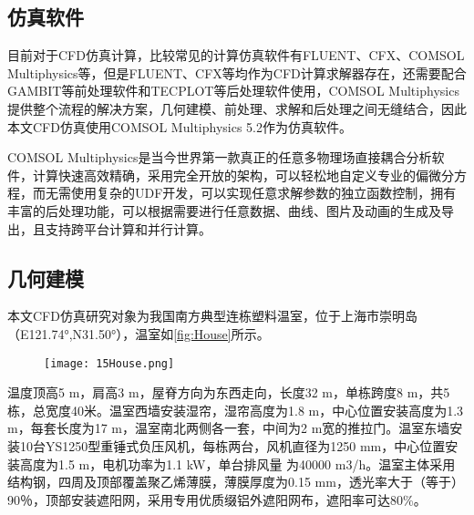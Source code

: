 	\subsection{仿真软件}
	目前对于CFD仿真计算，比较常见的计算仿真软件有FLUENT、CFX、COMSOL Multiphysics等，但是FLUENT、CFX等均作为CFD计算求解器存在，还需要配合GAMBIT等前处理软件和TECPLOT等后处理软件使用，COMSOL Multiphysics提供整个流程的解决方案，几何建模、前处理、求解和后处理之间无缝结合，因此本文CFD仿真使用COMSOL Multiphysics 5.2作为仿真软件。
	
COMSOL Multiphysics是当今世界第一款真正的任意多物理场直接耦合分析软件，计算快速高效精确，采用完全开放的架构，可以轻松地自定义专业的偏微分方程，而无需使用复杂的UDF开发，可以实现任意求解参数的独立函数控制，拥有丰富的后处理功能，可以根据需要进行任意数据、曲线、图片及动画的生成及导出，且支持跨平台计算和并行计算\supercite{Comsol2015}。

	\subsection{几何建模}
本文CFD仿真研究对象为我国南方典型连栋塑料温室，位于上海市崇明岛（E121.74°,N31.50°），温室如\ref{fig:House}所示。
	\begin{figure}[!htp]
		\centering
		\texttt{[image: 15House.png]}
	\end{figure}
温度顶高5 m，肩高3 m，屋脊方向为东西走向，长度32 m，单栋跨度8 m，共5栋，总宽度40米。温室西墙安装湿帘，湿帘高度为1.8 m，中心位置安装高度为1.3 m，每套长度为17 m，温室南北两侧各一套，中间为2 m宽的推拉门。温室东墙安装10台YS1250型重锤式负压风机，每栋两台，风机直径为1250 mm，中心位置安装高度为1.5 m，电机功率为1.1 kW，单台排风量 为40000 m3/h。温室主体采用结构钢，四周及顶部覆盖聚乙烯薄膜，薄膜厚度为0.15 mm，透光率大于（等于）90％，顶部安装遮阳网，采用专用优质缀铝外遮阳网布，遮阳率可达80\%。

